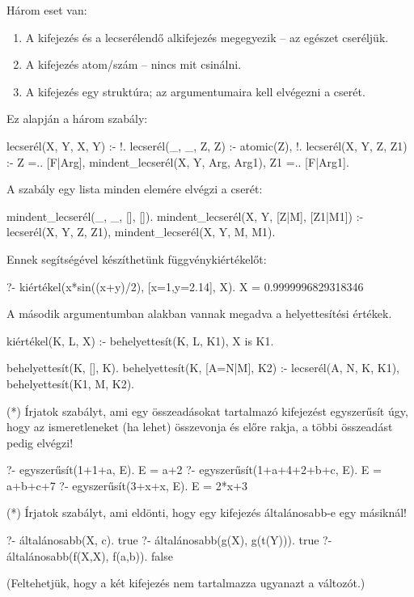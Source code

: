 Három eset van:
\begin{enumerate}
\item A kifejezés és a lecserélendő alkifejezés
  megegyezik -- az egészet cseréljük.
\item A kifejezés atom/szám -- nincs mit csinálni.
\item A kifejezés egy struktúra; az argumentumaira
  kell elvégezni a cserét.
\end{enumerate}
Ez alapján a három szabály:
\begin{program}
lecserél(X, Y, X, Y) :- !.
lecserél(_, _, Z, Z) :- atomic(Z), !.
lecserél(X, Y, Z, Z1) :-
    Z =.. [F|Arg],
    mindent_lecserél(X, Y, Arg, Arg1),
    Z1 =.. [F|Arg1].
\end{program}
A  szabály egy lista minden
elemére elvégzi a cserét:
\begin{program}
mindent_lecserél(_, _, [], []).
mindent_lecserél(X, Y, [Z|M], [Z1|M1]) :-
    lecserél(X, Y, Z, Z1),
    mindent_lecserél(X, Y, M, M1).
\end{program}
Ennek segítségével készíthetünk függvénykiértékelőt:
\begin{query}
?- kiértékel(x*sin((x+y)/2), [x=1,y=2.14], X).
X = 0.9999996829318346
\end{query}
A második argumentumban 
alakban vannak megadva a helyettesítési értékek.
\begin{program}
kiértékel(K, L, X) :-
    behelyettesít(K, L, K1), X is K1.

behelyettesít(K, [], K).
behelyettesít(K, [A=N|M], K2) :-
    lecserél(A, N, K, K1),
    behelyettesít(K1, M, K2).
\end{program}

\begin{problem}
(*) Írjatok szabályt, ami egy összeadásokat
  tartalmazó kifejezést egyszerűsít úgy, hogy az
  ismeretleneket (ha lehet) összevonja és előre
  rakja, a többi összeadást pedig elvégzi!
\begin{query}
?- egyszerűsít(1+1+a, E).
E = a+2
?- egyszerűsít(1+a+4+2+b+c, E).
E = a+b+c+7
?- egyszerűsít(3+x+x, E).
E = 2*x+3
\end{query}
\end{problem}
\begin{problem}
(*) Írjatok szabályt, ami eldönti, hogy egy
  kifejezés általánosabb-e egy másiknál!
\begin{query}
?- általánosabb(X, c).
true
?- általánosabb(g(X), g(t(Y))).
true
?- általánosabb(f(X,X), f(a,b)).
false
\end{query}
(Feltehetjük, hogy a két kifejezés nem tartalmazza
ugyanazt a változót.)
\end{problem}

